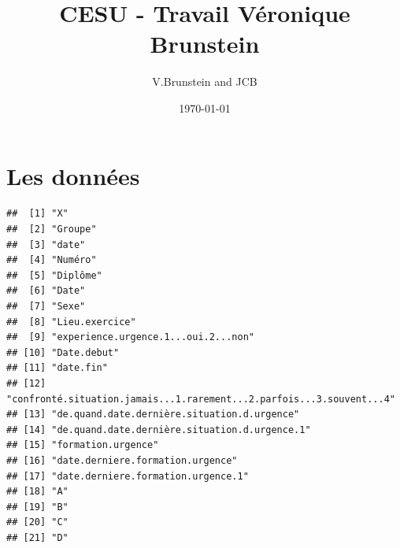\documentclass[12pt,english,french]{article}\usepackage{graphicx, color}
\makeatletter
\newenvironment{kframe}{%
 \def\at@end@of@kframe{}%
 \ifinner\ifhmode%
  \def\at@end@of@kframe{\end{minipage}}%
  \begin{minipage}{\columnwidth}%
 \fi\fi%
 \def\FrameCommand##1{\hskip\@totalleftmargin \hskip-\fboxsep
 \colorbox{shadecolor}{##1}\hskip-\fboxsep
     \hskip-\linewidth \hskip-\@totalleftmargin \hskip\columnwidth}%
 \MakeFramed {\advance\hsize-\width
   \@totalleftmargin\z@ \linewidth\hsize
   \@setminipage}}%
 {\par\unskip\endMakeFramed%
 \at@end@of@kframe}
\newenvironment{knitrout}{}{} %
\makeatother
\begin{document}
\title{CESU - Travail Véronique Brunstein}
\author{V.Brunstein and JCB}
\date{\today}
\maketitle

\tableofcontents
\listoftables
\listoffigures

\section{Les données}


\begin{knitrout}
\color{fgcolor}\begin{kframe}
\begin{verbatim}
##  [1] "X"                                                                  
##  [2] "Groupe"                                                             
##  [3] "date"                                                               
##  [4] "Numéro"                                                             
##  [5] "Diplôme"                                                            
##  [6] "Date"                                                               
##  [7] "Sexe"                                                               
##  [8] "Lieu.exercice"                                                      
##  [9] "experience.urgence.1...oui.2...non"                                 
## [10] "Date.debut"                                                         
## [11] "date.fin"                                                           
## [12] "confronté.situation.jamais...1.rarement...2.parfois...3.souvent...4"
## [13] "de.quand.date.dernière.situation.d.urgence"                         
## [14] "de.quand.date.dernière.situation.d.urgence.1"                       
## [15] "formation.urgence"                                                  
## [16] "date.derniere.formation.urgence"                                    
## [17] "date.derniere.formation.urgence.1"                                  
## [18] "A"                                                                  
## [19] "B"                                                                  
## [20] "C"                                                                  
## [21] "D"                                                                  

\end{verbatim}
\end{kframe}
\end{knitrout}
\end{document}
